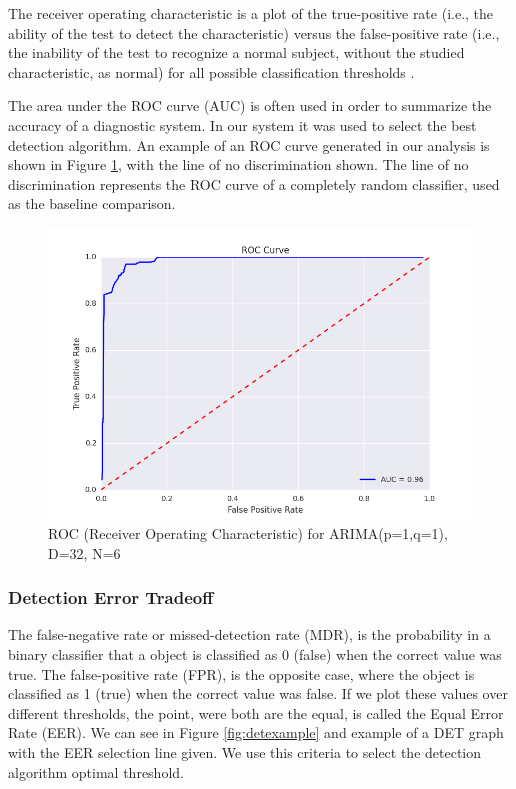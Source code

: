 \documentclass{acm_proc_article-sp}
\begin{document}
The  receiver operating characteristic is a plot of the true-positive rate (i.e., the ability of the test to detect the characteristic)
 versus the false-positive rate  (i.e., the inability of the test to recognize a normal subject,
without the studied characteristic, as normal) for all possible classification thresholds \cite{Martinez}. 

The area under the ROC curve (AUC) is often used in order to summarize the accuracy of a diagnostic system. In our system
it was used to select the best detection algorithm. An example of an ROC curve generated in our analysis is shown in Figure \ref{fig:rocexample}, with the line of no discrimination shown. The line of no discrimination represents the ROC curve of a completely random classifier, used as the baseline comparison.

\begin{figure}[!h]
\centering
    \includegraphics[scale=0.4]{figures/roc.png}
\caption{ROC (Receiver Operating Characteristic) for ARIMA(p=1,q=1), D=32, N=6} 
\label{fig:rocexample}
\end{figure}

\subsubsection{Detection Error Tradeoff}

The false-negative rate or missed-detection rate (MDR), is the probability in a binary classifier that a object is classified as 0 (false)
when the correct value was true. The false-positive rate (FPR), is the opposite case, where the object is classified as 1 (true)
when the correct value was false. If we plot these values over different thresholds, the point, were both are the equal, is called the Equal
Error Rate (EER). We can see in Figure \ref{fig:detexample} and example of a DET graph with the EER selection line given. We use this criteria to select the detection algorithm optimal threshold.
\end{document}
